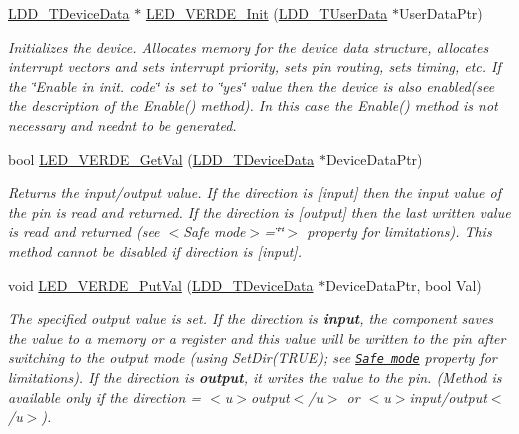 \begin{DoxyCompactItemize}
\item 
\hyperlink{group___p_e___types__module_gac5cf1362f1f0e3a2ce71b1bf2276d091}{L\+D\+D\+\_\+\+T\+Device\+Data} $\ast$ \hyperlink{group___l_e_d___v_e_r_d_e__module_ga6e76b61ceb99f72271e97f7978ac3b6c}{L\+E\+D\+\_\+\+V\+E\+R\+D\+E\+\_\+\+Init} (\hyperlink{group___p_e___types__module_ga0b66a73f87238a782318aa0be7578e35}{L\+D\+D\+\_\+\+T\+User\+Data} $\ast$User\+Data\+Ptr)
\begin{DoxyCompactList}\small\item\em Initializes the device. Allocates memory for the device data structure, allocates interrupt vectors and sets interrupt priority, sets pin routing, sets timing, etc. If the \char`\"{}\+Enable
    in init. code\char`\"{} is set to \char`\"{}yes\char`\"{} value then the device is also enabled(see the description of the Enable() method). In this case the Enable() method is not necessary and needn\textquotesingle{}t to be generated. \end{DoxyCompactList}\item 
bool \hyperlink{group___l_e_d___v_e_r_d_e__module_gae737455cf5902b6e5f79b47aecececea}{L\+E\+D\+\_\+\+V\+E\+R\+D\+E\+\_\+\+Get\+Val} (\hyperlink{group___p_e___types__module_gac5cf1362f1f0e3a2ce71b1bf2276d091}{L\+D\+D\+\_\+\+T\+Device\+Data} $\ast$Device\+Data\+Ptr)
\begin{DoxyCompactList}\small\item\em Returns the input/output value. If the direction is \mbox{[}input\mbox{]} then the input value of the pin is read and returned. If the direction is \mbox{[}output\mbox{]} then the last written value is read and returned (see $<$\+Safe mode$>$=\char`\"{}\char`\"{}$>$ property for limitations). This method cannot be disabled if direction is \mbox{[}input\mbox{]}. \end{DoxyCompactList}\item 
void \hyperlink{group___l_e_d___v_e_r_d_e__module_ga9e0b060297ed839406b447f52ba1b68f}{L\+E\+D\+\_\+\+V\+E\+R\+D\+E\+\_\+\+Put\+Val} (\hyperlink{group___p_e___types__module_gac5cf1362f1f0e3a2ce71b1bf2276d091}{L\+D\+D\+\_\+\+T\+Device\+Data} $\ast$Device\+Data\+Ptr, bool Val)
\begin{DoxyCompactList}\small\item\em The specified output value is set. If the direction is {\bfseries  input}, the component saves the value to a memory or a register and this value will be written to the pin after switching to the output mode (using {\ttfamily Set\+Dir(\+T\+R\+U\+E)}; see \href{BitIOProperties.html#SafeMode}{\tt Safe mode} property for limitations). If the direction is {\bfseries output}, it writes the value to the pin. (Method is available only if the direction = $<$u$>${\ttfamily output}$<$/u$>$ or $<$u$>${\ttfamily  input/output}$<$/u$>$). \end{DoxyCompactList}\item 

\end{DoxyCompactItemize}
